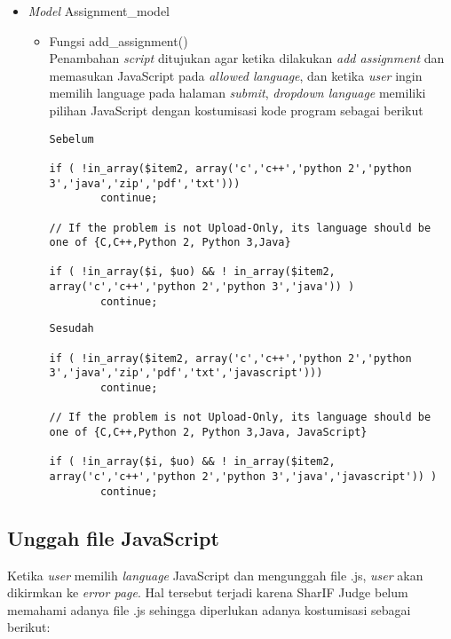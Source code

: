  \begin{itemize}
     \item \textit{Model} Assignment\_model
     \begin{itemize}
         \item Fungsi add\_assignment()\\
         Penambahan \textit{script} ditujukan agar ketika dilakukan \textit{add assignment} dan memasukan JavaScript pada \textit{allowed language}, dan ketika \textit{user} ingin memilih language pada halaman \textit{submit}, \textit{dropdown language} memiliki pilihan JavaScript dengan kostumisasi kode program sebagai berikut
         \begin{lstlisting}[basicstyle=\ttfamily, frame=single,
    columns=fullflexible, breaklines=true, numbers=none]
Sebelum 

if ( !in_array($item2, array('c','c++','python 2','python 3','java','zip','pdf','txt')))
        continue;
        
// If the problem is not Upload-Only, its language should be one of {C,C++,Python 2, Python 3,Java}

if ( !in_array($i, $uo) && ! in_array($item2, array('c','c++','python 2','python 3','java')) )
        continue;

    \end{lstlisting}

\begin{lstlisting}[basicstyle=\ttfamily, frame=single,
    columns=fullflexible, breaklines=true, numbers=none]
Sesudah 

if ( !in_array($item2, array('c','c++','python 2','python 3','java','zip','pdf','txt','javascript')))
        continue;
        
// If the problem is not Upload-Only, its language should be one of {C,C++,Python 2, Python 3,Java, JavaScript}

if ( !in_array($i, $uo) && ! in_array($item2, array('c','c++','python 2','python 3','java','javascript')) )
        continue;

    \end{lstlisting}

     \end{itemize}
 \end{itemize}
 
 \subsection{Unggah file JavaScript}
 \label{sec: Unggah file JavaScript}
 Ketika \textit{user} memilih \textit{language} JavaScript dan mengunggah file .js, \textit{user} akan dikirmkan ke \textit{error page}. Hal tersebut terjadi karena SharIF Judge belum memahami adanya file .js sehingga diperlukan adanya kostumisasi sebagai berikut: 
 
